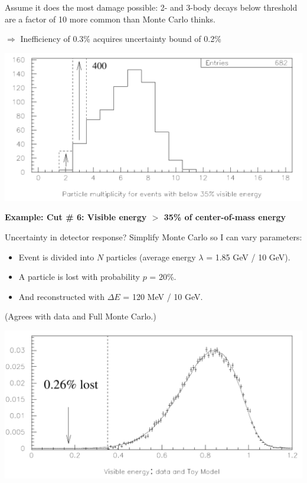 \documentclass[landscape]{article}
\begin{document}
Assume it does the most damage possible: 2- and 3-body decays below
threshold are a factor of 10 more common than Monte Carlo thinks.

\vfill

$\Longrightarrow$ Inefficiency of 0.3\% acquires uncertainty bound of 0.2\%

\vfill

\includegraphics[width=\linewidth]{multiplicity_revamp.pdf}

\pagebreak

{\bf Example: Cut \# 6: Visible energy $>$ 35\% of center-of-mass energy}

\vfill

Uncertainty in detector response?  Simplify Monte Carlo so I can vary
parameters:

\begin{itemize}

  \item Event is divided into $N$ particles (average energy $\lambda$
  = 1.85 GeV / 10 GeV).

  \item A particle is lost with probability $p$ = 20\%.

  \item And reconstructed with $\Delta E$ = 120 MeV / 10 GeV.

\end{itemize}

(Agrees with data and Full Monte Carlo.)

\vfill

\includegraphics[width=\linewidth]{toymodel1_revamp.pdf}
\end{document}
